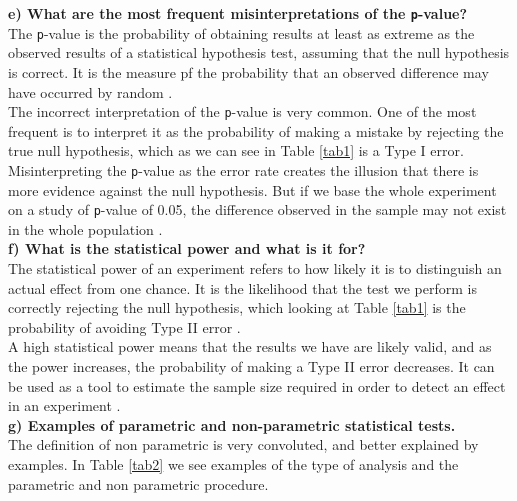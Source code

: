 \documentclass{article}
\begin{document}
\textbf{e) What are the most frequent misinterpretations of the \texttt{p}-value?}\\

The \texttt{p}-value is the probability of obtaining results at least as extreme as the observed results of a statistical hypothesis test, assuming that the null hypothesis is correct. It is the measure pf the probability that an observed difference may have occurred by random \cite{inv1}.\\

The incorrect interpretation of the \texttt{p}-value is very common. One of the most frequent is to interpret it as the probability of making a mistake by rejecting the true null hypothesis, which as we can see in Table \ref{tab1} is a Type I error.\\

Misinterpreting the \texttt{p}-value as the error rate creates the illusion that there is more evidence against the null hypothesis. But if we base the whole experiment on a study of \texttt{p}-value of 0.05, the difference observed in the sample may not exist in the whole population \cite{minitab}.\\

\textbf{f) What is the statistical power and what is it for?}\\

The statistical power of an experiment refers to how likely it is to distinguish an actual effect from one chance. It is the likelihood that the test we perform is correctly rejecting the null hypothesis, which looking at Table \ref{tab1} is the probability of avoiding Type II error \cite{stats1}. \\

A high statistical power means that the results we have are likely valid, and as the power increases, the probability of making a Type II error decreases.  It can be used as a tool to estimate the sample size required in order to detect an effect in an experiment \cite{sthowto2}.\\

\textbf{g) Examples of parametric and non-parametric statistical tests.}\\

The definition of non parametric is very convoluted, and better explained by examples. In Table \ref{tab2} we see examples of the type of analysis and the parametric and non parametric procedure.\\
\end{document}
